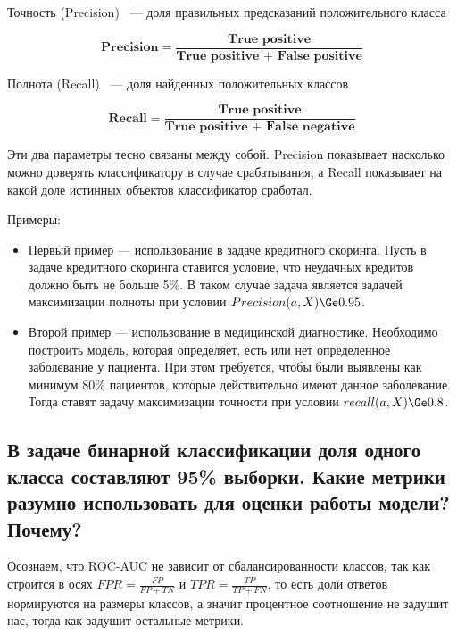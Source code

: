 \Def Точность (Precision) ~--- доля правильных предсказаний положительного класса

$$\textbf{Precision} = \frac{\textbf{True positive}}{\textbf{True positive + False positive}}$$

\Def Полнота (Recall) ~--- доля найденных положительных классов 

$$\textbf{Recall} = \frac{\textbf{True positive}}{\textbf{True positive + False negative}}$$

Эти два параметры тесно связаны между собой. Precision показывает насколько можно доверять классификатору в случае срабатывания, а Recall показывает на какой доле истинных объектов классификатор сработал.

Примеры:

\begin{itemize}
    \item Первый пример — использование в задаче кредитного скоринга. Пусть в задаче кредитного скоринга ставится условие, что неудачных кредитов должно быть не больше 5\%. В таком случае задача является задачей максимизации полноты при условии $Precision(a,X) \Ge 0.95$.
    \item Второй пример — использование в медицинской диагностике. Необходимо построить модель, которая определяет, есть или нет определенное заболевание у пациента. При этом требуется, чтобы были выявлены как минимум 80\% пациентов, которые действительно имеют данное заболевание. Тогда ставят задачу максимизации точности при условии $recall(a,X) \Ge 0.8$.
\end{itemize}











\subsection{В задаче бинарной классификации доля одного класса составляют 95\% выборки. Какие
метрики разумно использовать для оценки работы модели? Почему?}

Осознаем, что ROC-AUC не зависит от сбалансированности классов, так как строится в осях $FPR = \frac{FP}{FP + TN}$ и $TPR = \frac{TP}{TP + FN}$, то есть доли ответов нормируются на размеры классов, а значит процентное соотношение не задушит нас, тогда как задушит остальные метрики.






